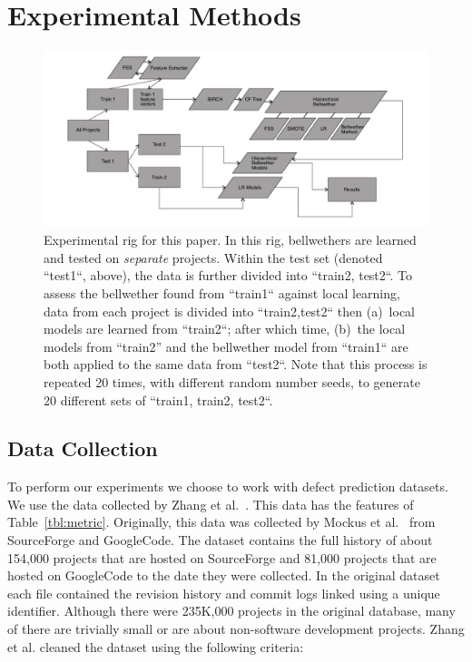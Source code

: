 \documentclass[10pt,journal,compsoc]{IEEEtran}
\begin{document}


\section{Experimental Methods}
\label{sec:Data Collection}

\begin{figure}[!t]
    \centering
    \includegraphics[width=\linewidth]{figs/General.pdf}
    \caption{ Experimental rig for this paper.  In this rig, 
      bellwethers are
    learned and tested on {\em separate } projects. Within the test set (denoted ``test1``, above),
    the data is further divided into ``train2, test2``. To assess the bellwether found from ``train1`` against local learning, data from each project is divided into ``train2,test2``
    then (a)~local
    models are learned from   ``train2``; after which time,
    (b)~the local models from ``train2'' and the bellwether model from ``train1``
    are both applied to the same data from ``test2``.
    Note that this process is repeated 20 times, with different random number seeds, to generate 20 different sets of ``train1, train2, test2``.
    }
    \label{fig:GENERAL}
\end{figure}

\subsection{Data Collection}
\label{sec:data}

To perform our experiments we choose to work with defect prediction datasets. We use 
the data collected by Zhang et al.~\cite{zhang15}.
This data has the features of Table~\ref{tbl:metric}.
Originally, this data  was collected by Mockus et al.~\cite{mockus2009amassing} from SourceForge and GoogleCode. The dataset contains the full history of about 154,000 projects that are hosted on SourceForge and 81,000 projects that are hosted on GoogleCode to the date they were collected. In the original dataset each file contained the revision history and commit logs linked using a unique identifier. Although there were 235K,000 projects in the original database, many of there are
trivially small or are about  non-software development projects. Zhang et al. cleaned the dataset using the following    criteria:
\end{document}

